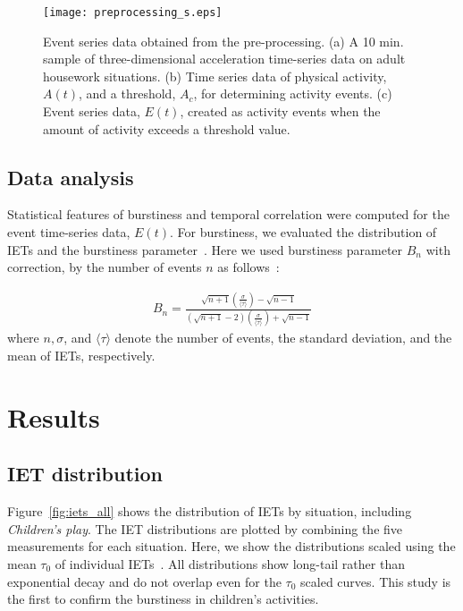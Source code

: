\documentclass{bmcart}
\begin{document}
\begin{figure}[ht]
\centering
 \texttt{[image: preprocessing\_s.eps]}
 \caption{Event series data obtained from the pre-processing. (a) A 10 min. sample of three-dimensional acceleration time-series data on adult housework situations. (b) Time series data of physical activity, $A(t)$, and a threshold, $A_c$, for determining activity events. (c) Event series data, $E(t)$, created as activity events when the amount of activity exceeds a threshold value.}
 \label{fig:preprocessing}
\end{figure}
 
\subsection{Data analysis}
Statistical features of burstiness and temporal correlation were computed for the event time-series data, $E(t)$.
For burstiness, we evaluated the distribution of IETs and the burstiness parameter~\cite{Goh_2008, PhysRevE.94.032311}.
Here we used burstiness parameter $B_n$ with correction, by the number of events $n$ as follows~\cite{PhysRevE.94.032311}:

\begin{eqnarray}
B_n = \frac{\sqrt{n+1} \left( \frac{\sigma}{\langle \tau \rangle} \right)-\sqrt{n-1}}{(\sqrt{n+1}-2)\left(\frac{\sigma}{\langle \tau \rangle}\right)+\sqrt{n-1}}
\label{eq:bn}
\end{eqnarray}
where $n, \sigma$, and $\langle \tau \rangle$ denote the number of events, the standard deviation, and the mean of IETs, respectively.

\section{Results}
\subsection{IET distribution}
Figure~\ref{fig:iets_all} shows the distribution of IETs by situation, including \textit{Children's play}. The IET distributions are plotted by combining the five measurements for each situation. Here, we show the distributions scaled using the mean $\tau_0$ of individual IETs~\cite{Goh_2008}. All distributions show long-tail rather than exponential decay and do not overlap even for the $\tau_0$ scaled curves.
This study is the ﬁrst to confirm the burstiness in children's activities.
\end{document}
